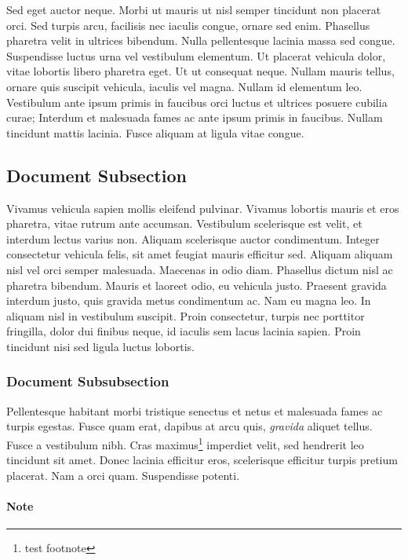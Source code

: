 \documentclass[12pt,a4paper]{book}
\begin{document}
Sed eget auctor neque. Morbi ut mauris ut nisl semper tincidunt non placerat orci.
Sed turpis arcu, facilisis nec iaculis congue, ornare sed enim.
Phasellus pharetra velit in ultrices bibendum. Nulla pellentesque lacinia massa sed congue.
Suspendisse luctus urna vel vestibulum elementum. Ut placerat vehicula dolor, vitae
lobortis libero pharetra eget. Ut ut consequat neque. Nullam mauris tellus, ornare quis
suscipit vehicula, iaculis vel magna. Nullam id elementum leo. Vestibulum ante ipsum primis
in faucibus orci luctus et ultrices posuere cubilia curae; Interdum et malesuada fames ac
ante ipsum primis in faucibus. Nullam tincidunt mattis lacinia. Fusce aliquam at ligula
vitae congue.

\subsection{Document Subsection}

Vivamus vehicula sapien mollis eleifend pulvinar. Vivamus lobortis mauris et eros pharetra,
vitae rutrum ante accumsan. Vestibulum scelerisque est velit, et interdum lectus varius
non. Aliquam scelerisque auctor condimentum. Integer consectetur vehicula felis, sit amet
feugiat mauris efficitur sed. Aliquam aliquam nisl vel orci semper malesuada.
Maecenas in odio diam. Phasellus dictum nisl ac pharetra bibendum. Mauris et laoreet odio,
eu vehicula justo. Praesent gravida interdum justo, quis gravida metus condimentum ac.
Nam eu magna leo. In aliquam nisl in vestibulum suscipit. Proin consectetur, turpis nec
porttitor fringilla, dolor dui finibus neque, id iaculis sem lacus lacinia sapien. Proin
tincidunt nisi sed ligula luctus lobortis.

\subsubsection{Document Subsubsection}

Pellentesque habitant morbi tristique senectus et netus et malesuada fames ac turpis
egestas. Fusce quam erat, dapibus at arcu quis, \textit{gravida} aliquet tellus. Fusce a vestibulum
nibh. Cras maximus\footnote{test footnote} imperdiet velit, sed hendrerit leo tincidunt sit amet.
Donec lacinia efficitur eros, scelerisque efficitur turpis pretium placerat. Nam a orci
quam. Suspendisse potenti.

\paragraph{Note}
\end{document}
